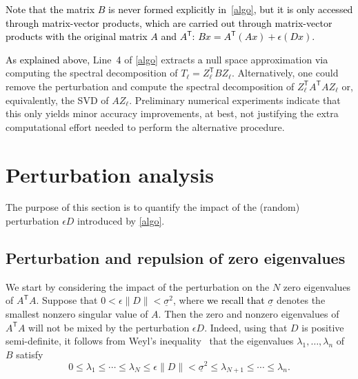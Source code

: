 \documentclass{siamart190516}
\newcommand{\Ttran}{\mathsf{T}}
\newcommand{\T}{\mathsf{T}}
\newcommand{\edit}[1]{\textcolor{black}{#1}} %
\begin{document}
\edit{Note that the matrix $B$ is never formed explicitly in~\cref{algo}, but it is only accessed through matrix-vector products, which are carried out through matrix-vector products with the original matrix $A$ and $A^\Ttran$: $Bx = A^{\Ttran}(Ax) + \epsilon (Dx)$.}
\begin{remark}
\edit{As explained above,}
Line~\edit{4} of \cref{algo} extracts \edit{a} null space approximation \edit{via} computing the spectral decomposition of $T_{\ell} = Z_{\ell}^\T B Z_{\ell}$.
Alternatively, one could remove the perturbation and compute the spectral decomposition of $Z_{\ell}^\T A^\T A Z_{\ell}$ or, equivalently, the SVD of $AZ_{\ell}$. Preliminary numerical experiments indicate that this only yields minor accuracy improvements, at best, not justifying the extra computational effort needed to perform the alternative procedure.  
\end{remark} 




\section{Perturbation analysis} \label{sec:perturbationtheory}

The purpose of this section is to quantify the impact
of the (random) perturbation $\epsilon D$ introduced by \cref{algo}.

\subsection{Perturbation and repulsion of zero eigenvalues}

We start by considering the impact of the perturbation on the $N$ zero eigenvalues of $A^\T A$.
Suppose that $0<\epsilon\|D\| <\underline{\sigma}^{2}$,
where \edit{we recall that} $\underline{\sigma}$ denotes the smallest nonzero singular value of $A$. Then the zero and nonzero eigenvalues of $A^\T A$ will not be mixed by the perturbation $\epsilon D$. Indeed, using that $D$ is positive semi-definite, it follows from 
Weyl's inequality~\cite[Theorem 4.3.1]{Horn2012} that the eigenvalues $\lambda_1,\dotsc, \lambda_n$ of $B$ satisfy
\begin{equation} \label{eq:propevB}
    0\leq \lambda_{1}\leq \dotsb\leq \lambda_{N}\leq \epsilon \|D\| < \underline{\sigma}^{2}  \leq \lambda_{N+1}\leq \dotsb\leq \lambda_{n}. 
\end{equation}
\end{document}
